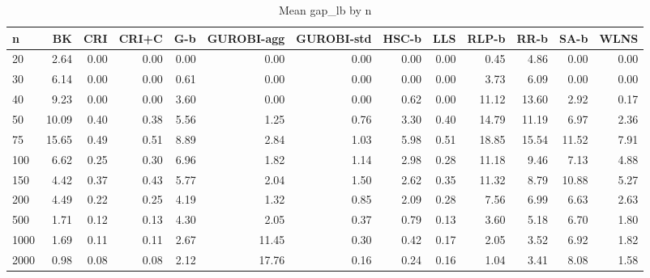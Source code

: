 \begin{table}[htbp]
\centering
\small
\caption{Mean gap\_lb by n}
\label{tab:E4a_equal_budgets_b10_by_n}
\begin{tabular}{lrrrrrrrrrrrr}
\toprule
n & BK & CRI & CRI+C & G-b & GUROBI-agg & GUROBI-std & HSC-b & LLS & RLP-b & RR-b & SA-b & WLNS \\
\midrule
20 & 2.64 & 0.00 & 0.00 & 0.00 & 0.00 & 0.00 & 0.00 & 0.00 & 0.45 & 4.86 & 0.00 & 0.00 \\
30 & 6.14 & 0.00 & 0.00 & 0.61 & 0.00 & 0.00 & 0.00 & 0.00 & 3.73 & 6.09 & 0.00 & 0.00 \\
40 & 9.23 & 0.00 & 0.00 & 3.60 & 0.00 & 0.00 & 0.62 & 0.00 & 11.12 & 13.60 & 2.92 & 0.17 \\
50 & 10.09 & 0.40 & 0.38 & 5.56 & 1.25 & 0.76 & 3.30 & 0.40 & 14.79 & 11.19 & 6.97 & 2.36 \\
75 & 15.65 & 0.49 & 0.51 & 8.89 & 2.84 & 1.03 & 5.98 & 0.51 & 18.85 & 15.54 & 11.52 & 7.91 \\
100 & 6.62 & 0.25 & 0.30 & 6.96 & 1.82 & 1.14 & 2.98 & 0.28 & 11.18 & 9.46 & 7.13 & 4.88 \\
150 & 4.42 & 0.37 & 0.43 & 5.77 & 2.04 & 1.50 & 2.62 & 0.35 & 11.32 & 8.79 & 10.88 & 5.27 \\
200 & 4.49 & 0.22 & 0.25 & 4.19 & 1.32 & 0.85 & 2.09 & 0.28 & 7.56 & 6.99 & 6.63 & 2.63 \\
500 & 1.71 & 0.12 & 0.13 & 4.30 & 2.05 & 0.37 & 0.79 & 0.13 & 3.60 & 5.18 & 6.70 & 1.80 \\
1000 & 1.69 & 0.11 & 0.11 & 2.67 & 11.45 & 0.30 & 0.42 & 0.17 & 2.05 & 3.52 & 6.92 & 1.82 \\
2000 & 0.98 & 0.08 & 0.08 & 2.12 & 17.76 & 0.16 & 0.24 & 0.16 & 1.04 & 3.41 & 8.08 & 1.58 \\
\bottomrule
\end{tabular}
\end{table}
